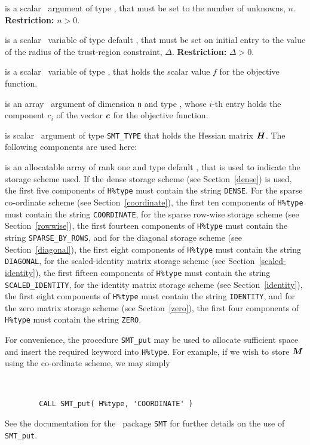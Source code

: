 \documentclass{galahad}
\begin{document}
\begin{description}

 is a scalar \intentin\ argument of type \integer, that must be
set to the number of unknowns, $n$. {\bf Restriction: } $n  >  0$.

 is a scalar \intentin\ variable of type default
\realdp,
that must be set on initial entry
to the value of the radius of the trust-region constraint, $\Delta$.
{\bf Restriction: } $\Delta > 0$.

 is a scalar \intentin\ variable of type \realdp, that holds
the scalar value $f$ for the objective function.

 is an array \intentin\ argument of dimension {\tt n} and
type \realdp,  whose $i$-th entry holds the component $c_i$ of
the vector ${\bm{c}}$ for the objective function.

 is scalar \intentin\ argument of type {\tt SMT\_TYPE}
that holds the Hessian matrix ${\bm{H}}$. The following components
are used here:

\begin{description}

 is an allocatable array of rank one and type default
\character, that
is used to indicate the storage scheme used. If the dense storage scheme
(see Section~\ref{dense}) is used,
the first five components of {\tt H\%type} must contain the
string {\tt DENSE}.
For the sparse co-ordinate scheme (see Section~\ref{coordinate}),
the first ten components of {\tt H\%type} must contain the
string {\tt COORDINATE},
for the sparse row-wise storage scheme (see Section~\ref{rowwise}),
the first fourteen components of {\tt H\%type} must contain the
string {\tt SPARSE\_BY\_ROWS},
and for the diagonal storage scheme (see Section~\ref{diagonal}),
the first eight components of {\tt H\%type} must contain the
string {\tt DIAGONAL},
for the scaled-identity matrix storage scheme
(see Section~\ref{scaled-identity}),
the first fifteen components of {\tt H\%type} must contain the
string {\tt SCALED\_IDENTITY},
for the identity matrix storage scheme
(see Section~\ref{identity}),
the first eight components of {\tt H\%type} must contain the
string {\tt IDENTITY}, and
for the zero matrix storage scheme
(see Section~\ref{zero}),
the first four components of {\tt H\%type} must contain the
string {\tt ZERO}.

For convenience, the procedure {\tt SMT\_put}
may be used to allocate sufficient space and insert the required keyword
into {\tt H\%type}.
For example, if we wish to store ${\bm{M}}$ using the co-ordinate scheme,
we may simply
{\tt
\begin{verbatim}
        CALL SMT_put( H%type, 'COORDINATE' )
\end{verbatim}
}
\noindent
See the documentation for the \galahad\ package {\tt SMT}
for further details on the use of {\tt SMT\_put}.


\end{description}
\end{description}
\end{document}
